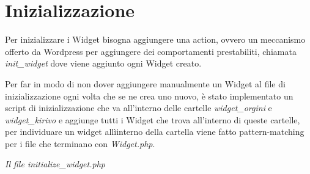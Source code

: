 \newpage

\section{Inizializzazione}
Per inizializzare i Widget bisogna aggiungere una action\cite{WPACTION}, ovvero un meccanismo offerto da Wordpress per aggiungere dei comportamenti
prestabiliti,  chiamata \emph{init\_widget} dove viene aggiunto ogni Widget creato.

Per far in modo di non dover aggiungere manualmente un Widget al file di inizializzazione ogni volta che se ne crea uno nuovo, è
stato implementato un script di inizializzazione che va all'interno delle cartelle \emph{widget\_orgini} e \emph{widget\_kirivo} e aggiunge tutti
i Widget che trova all'interno di queste cartelle, per individuare un widget allìinterno della cartella viene fatto pattern-matching per i file che terminano con \emph{Widget.php}.

\newpage


\emph{Il file initialize\_widget.php}

